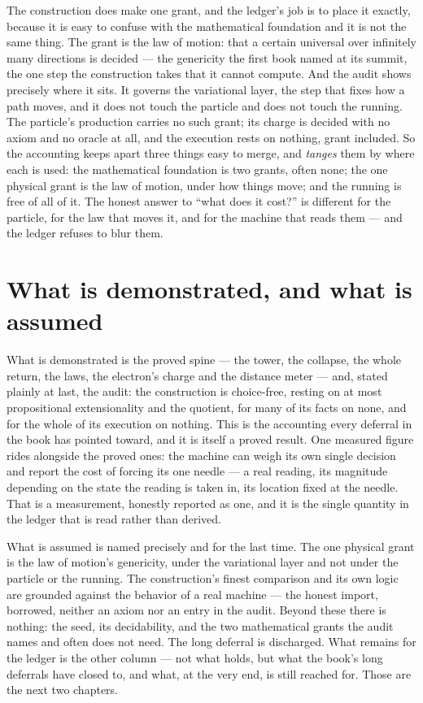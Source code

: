 The construction does make one grant, and the ledger's job is to place it exactly, because it is easy to
confuse with the mathematical foundation and it is not the same thing. The grant is the law of motion: that
a certain universal over infinitely many directions is decided --- the genericity the first book named at
its summit, the one step the construction takes that it cannot compute. And the audit shows precisely where
it sits. It governs the variational layer, the step that fixes how a path moves, and it does not touch the
particle and does not touch the running. The particle's production carries no such grant; its charge is
decided with no axiom and no oracle at all, and the execution rests on nothing, grant included. So the
accounting keeps apart three things easy to merge, and \emph{tanges} them by where each is used: the
mathematical foundation is two grants, often none; the one physical grant is the law of motion, under how
things move; and the running is free of all of it. The honest answer to ``what does it cost?'' is different
for the particle, for the law that moves it, and for the machine that reads them --- and the ledger refuses
to blur them.

\section{What is demonstrated, and what is assumed}
\label{se:demonstrated-assumed-V1}

What is demonstrated is the proved spine --- the tower, the collapse, the whole return, the laws, the
electron's charge and the distance meter --- and, stated plainly at last, the audit: the construction is
choice-free, resting on at most propositional extensionality and the quotient, for many of its facts on
none, and for the whole of its execution on nothing. This is the accounting every deferral in the book has
pointed toward, and it is itself a proved result. One measured figure rides alongside the proved ones: the
machine can weigh its own single decision and report the cost of forcing its one needle --- a real reading,
its magnitude depending on the state the reading is taken in, its location fixed at the needle. That is a
measurement, honestly reported as one, and it is the single quantity in the ledger that is read rather than
derived.

What is assumed is named precisely and for the last time. The one physical grant is the law of motion's
genericity, under the variational layer and not under the particle or the running. The construction's finest
comparison and its own logic are grounded against the behavior of a real machine --- the honest import,
borrowed, neither an axiom nor an entry in the audit. Beyond these there is nothing: the seed, its
decidability, and the two mathematical grants the audit names and often does not need. The long deferral is
discharged. What remains for the ledger is the other column --- not what holds, but what the book's long
deferrals have closed to, and what, at the very end, is still reached for. Those are the next two chapters.
